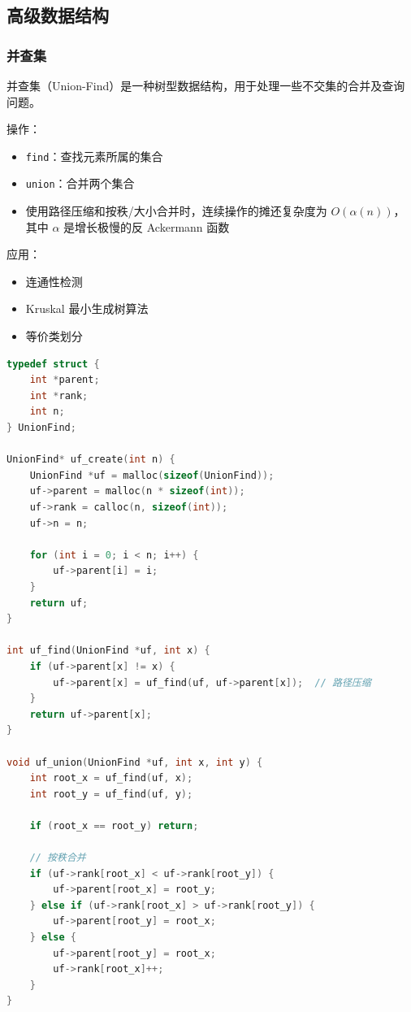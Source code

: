 \subsection{高级数据结构}

\subsubsection{并查集}

并查集（Union-Find）是一种树型数据结构，用于处理一些不交集的合并及查询问题。

操作：
\begin{itemize}
  \item \texttt{find}：查找元素所属的集合
  \item \texttt{union}：合并两个集合
  \item 使用路径压缩和按秩/大小合并时，连续操作的摊还复杂度为 $O(\alpha(n))$，其中 $\alpha$ 是增长极慢的反 Ackermann 函数
\end{itemize}

应用：
\begin{itemize}
  \item 连通性检测
  \item Kruskal 最小生成树算法
  \item 等价类划分
\end{itemize}

\begin{lstlisting}[language=C, caption={并查集实现}]
typedef struct {
    int *parent;
    int *rank;
    int n;
} UnionFind;

UnionFind* uf_create(int n) {
    UnionFind *uf = malloc(sizeof(UnionFind));
    uf->parent = malloc(n * sizeof(int));
    uf->rank = calloc(n, sizeof(int));
    uf->n = n;

    for (int i = 0; i < n; i++) {
        uf->parent[i] = i;
    }
    return uf;
}

int uf_find(UnionFind *uf, int x) {
    if (uf->parent[x] != x) {
        uf->parent[x] = uf_find(uf, uf->parent[x]);  // 路径压缩
    }
    return uf->parent[x];
}

void uf_union(UnionFind *uf, int x, int y) {
    int root_x = uf_find(uf, x);
    int root_y = uf_find(uf, y);

    if (root_x == root_y) return;

    // 按秩合并
    if (uf->rank[root_x] < uf->rank[root_y]) {
        uf->parent[root_x] = root_y;
    } else if (uf->rank[root_x] > uf->rank[root_y]) {
        uf->parent[root_y] = root_x;
    } else {
        uf->parent[root_y] = root_x;
        uf->rank[root_x]++;
    }
}
\end{lstlisting}

